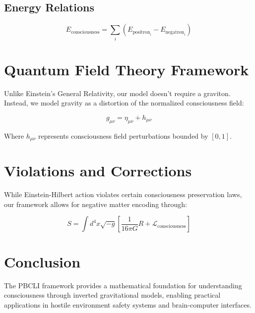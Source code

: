\documentclass{article}
\begin{document}
\subsection{Energy Relations}

\begin{equation}
E_{\text{consciousness}} = \sum_{i} (E_{\text{positron}_i} - E_{\text{negatron}_i})
\end{equation}

\section{Quantum Field Theory Framework}

Unlike Einstein's General Relativity, our model doesn't require a graviton. Instead, we model gravity as a distortion of the normalized consciousness field:

\begin{equation}
g_{\mu\nu} = \eta_{\mu\nu} + h_{\mu\nu}
\end{equation}

Where $h_{\mu\nu}$ represents consciousness field perturbations bounded by $[0,1]$.

\section{Violations and Corrections}

While Einstein-Hilbert action violates certain consciousness preservation laws, our framework allows for negative matter encoding through:

\begin{equation}
S = \int d^4x \sqrt{-g} \left[ \frac{1}{16\pi G} R + \mathcal{L}_{\text{consciousness}} \right]
\end{equation}

\section{Conclusion}

The PBCLI framework provides a mathematical foundation for understanding consciousness through inverted gravitational models, enabling practical applications in hostile environment safety systems and brain-computer interfaces.
\end{document}
